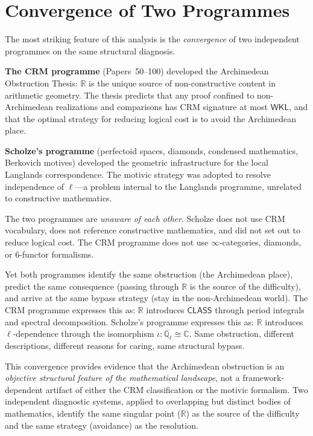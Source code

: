 \documentclass[11pt,a4paper]{article}
\theoremstyle{plain}
\theoremstyle{definition}
\newcommand{\WKL}{\textsf{WKL}}
\newcommand{\CLASS}{\textsf{CLASS}}
\newcommand{\Q}{\mathbb{Q}}
\newcommand{\R}{\mathbb{R}}
\newcommand{\C}{\mathbb{C}}
\begin{document}
\section{Convergence of Two Programmes}\label{sec:convergence}

The most striking feature of this analysis is the \emph{convergence} of two independent programmes on the same structural diagnosis.

\textbf{The CRM programme} (Papers~50--100) developed the Archimedean Obstruction Thesis: $\R$ is the unique source of non-constructive content in arithmetic geometry. The thesis predicts that any proof confined to non-Archimedean realizations and comparisons has CRM signature at most $\WKL$, and that the optimal strategy for reducing logical cost is to avoid the Archimedean place.

\textbf{Scholze's programme} (perfectoid spaces, diamonds, condensed mathematics, Berkovich motives) developed the geometric infrastructure for the local Langlands correspondence. The motivic strategy was adopted to resolve independence of $\ell$---a problem internal to the Langlands programme, unrelated to constructive mathematics.

The two programmes are \emph{unaware of each other}. Scholze does not use CRM vocabulary, does not reference constructive mathematics, and did not set out to reduce logical cost. The CRM programme does not use $\infty$-categories, diamonds, or 6-functor formalisms.

Yet both programmes identify the same obstruction (the Archimedean place), predict the same consequence (passing through $\R$ is the source of the difficulty), and arrive at the same bypass strategy (stay in the non-Archimedean world). The CRM programme expresses this as: $\R$ introduces $\CLASS$ through period integrals and spectral decomposition. Scholze's programme expresses this as: $\R$ introduces $\ell$-dependence through the isomorphism $\iota: \overline{\Q_\ell} \cong \C$. Same obstruction, different descriptions, different reasons for caring, same structural bypass.

This convergence provides evidence that the Archimedean obstruction is an \emph{objective structural feature of the mathematical landscape}, not a framework-dependent artifact of either the CRM classification or the motivic formalism. Two independent diagnostic systems, applied to overlapping but distinct bodies of mathematics, identify the same singular point ($\R$) as the source of the difficulty and the same strategy (avoidance) as the resolution.
\end{document}
